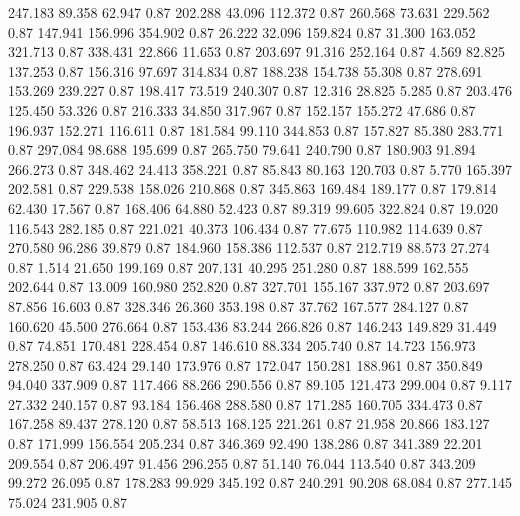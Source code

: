  247.183   89.358   62.947         0.87
 202.288   43.096  112.372         0.87
 260.568   73.631  229.562         0.87
 147.941  156.996  354.902         0.87
  26.222   32.096  159.824         0.87
  31.300  163.052  321.713         0.87
 338.431   22.866   11.653         0.87
 203.697   91.316  252.164         0.87
   4.569   82.825  137.253         0.87
 156.316   97.697  314.834         0.87
 188.238  154.738   55.308         0.87
 278.691  153.269  239.227         0.87
 198.417   73.519  240.307         0.87
  12.316   28.825    5.285         0.87
 203.476  125.450   53.326         0.87
 216.333   34.850  317.967         0.87
 152.157  155.272   47.686         0.87
 196.937  152.271  116.611         0.87
 181.584   99.110  344.853         0.87
 157.827   85.380  283.771         0.87
 297.084   98.688  195.699         0.87
 265.750   79.641  240.790         0.87
 180.903   91.894  266.273         0.87
 348.462   24.413  358.221         0.87
  85.843   80.163  120.703         0.87
   5.770  165.397  202.581         0.87
 229.538  158.026  210.868         0.87
 345.863  169.484  189.177         0.87
 179.814   62.430   17.567         0.87
 168.406   64.880   52.423         0.87
  89.319   99.605  322.824         0.87
  19.020  116.543  282.185         0.87
 221.021   40.373  106.434         0.87
  77.675  110.982  114.639         0.87
 270.580   96.286   39.879         0.87
 184.960  158.386  112.537         0.87
 212.719   88.573   27.274         0.87
   1.514   21.650  199.169         0.87
 207.131   40.295  251.280         0.87
 188.599  162.555  202.644         0.87
  13.009  160.980  252.820         0.87
 327.701  155.167  337.972         0.87
 203.697   87.856   16.603         0.87
 328.346   26.360  353.198         0.87
  37.762  167.577  284.127         0.87
 160.620   45.500  276.664         0.87
 153.436   83.244  266.826         0.87
 146.243  149.829   31.449         0.87
  74.851  170.481  228.454         0.87
 146.610   88.334  205.740         0.87
  14.723  156.973  278.250         0.87
  63.424   29.140  173.976         0.87
 172.047  150.281  188.961         0.87
 350.849   94.040  337.909         0.87
 117.466   88.266  290.556         0.87
  89.105  121.473  299.004         0.87
   9.117   27.332  240.157         0.87
  93.184  156.468  288.580         0.87
 171.285  160.705  334.473         0.87
 167.258   89.437  278.120         0.87
  58.513  168.125  221.261         0.87
  21.958   20.866  183.127         0.87
 171.999  156.554  205.234         0.87
 346.369   92.490  138.286         0.87
 341.389   22.201  209.554         0.87
 206.497   91.456  296.255         0.87
  51.140   76.044  113.540         0.87
 343.209   99.272   26.095         0.87
 178.283   99.929  345.192         0.87
 240.291   90.208   68.084         0.87
 277.145   75.024  231.905         0.87
